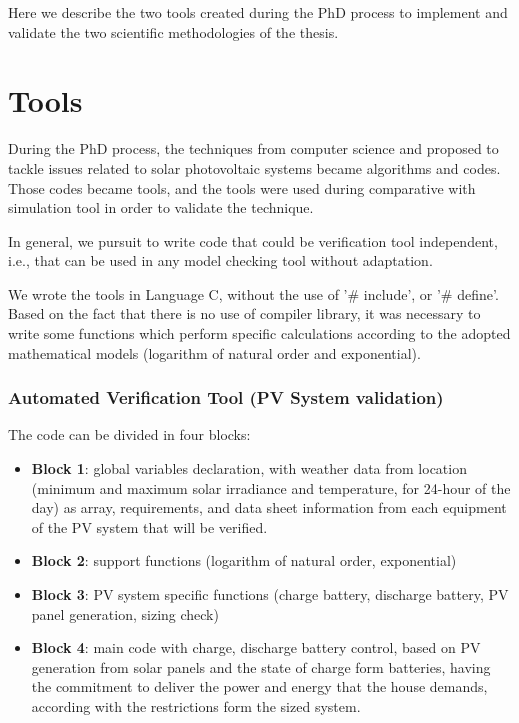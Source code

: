 Here we describe the two tools created during the PhD process to implement and validate the two scientific methodologies of the thesis.

\section{Tools}

During the PhD process, the techniques from computer science and proposed to tackle issues related to solar photovoltaic systems became algorithms and codes. Those codes became tools, and the tools were used during comparative with simulation tool in order to validate the technique.

In general, we pursuit to write code that could be verification tool independent, i.e., that can be used in any model checking tool without adaptation.

We wrote the tools in Language C, without the use of '\# include', or '\# define'. Based on the fact that there is no use of compiler library, it was necessary to write some functions which perform specific calculations according to the adopted mathematical models (logarithm of natural order and exponential).

\subsubsection{Automated Verification Tool (PV System validation)}

The code can be divided in four blocks:

\begin{itemize}
\item \textbf{Block 1}: global variables declaration, with weather data from location (minimum and maximum solar irradiance and temperature, for 24-hour of the day) as array, requirements, and data sheet information from each equipment of the PV system that will be verified. 

\item \textbf{Block 2}: support functions (logarithm of natural order, exponential)

\item \textbf{Block 3}: PV system specific functions (charge battery, discharge battery, PV panel generation, sizing check)

\item \textbf{Block 4}: main code with charge, discharge battery control, based on PV generation from solar panels and the state of charge form batteries, having the commitment to deliver the power and energy that the house demands, according with the restrictions form the sized system.
\end{itemize}

